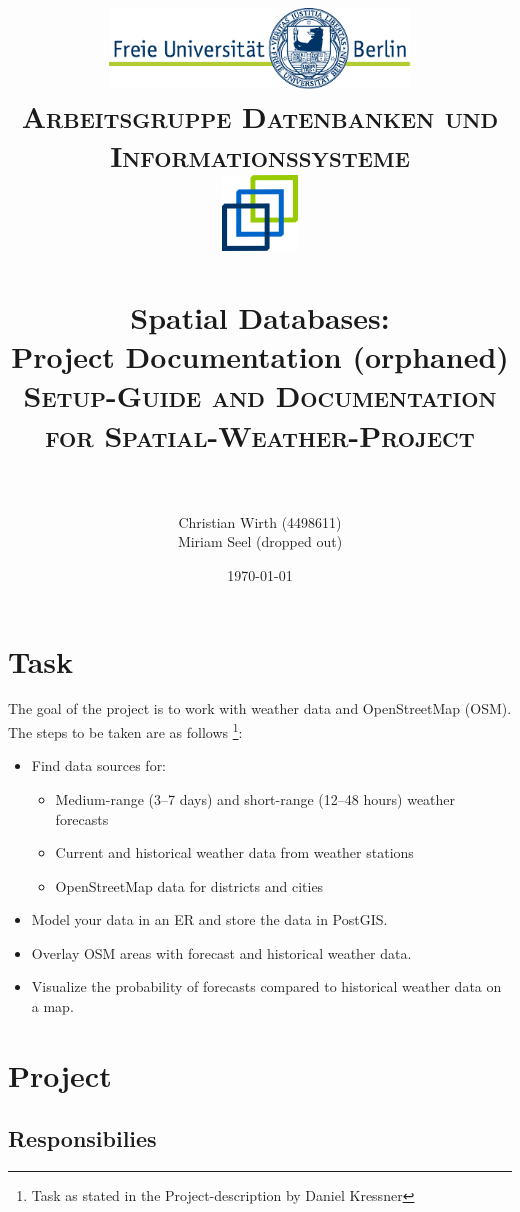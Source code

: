 \documentclass[paper=a4, fontsize=11pt]{article} %
\title{	
\normalfont \normalsize 
\textsc{\includegraphics[width=0.6\textwidth]{pictures/logo} \\ [5pt] Arbeitsgruppe Datenbanken und Informationssysteme \\ [20pt] \includegraphics[width=0.15\textwidth]{pictures/DBIS_Logo_rgb_web.png}} \\ [10pt] %
\horrule{0.5pt} \\[0.4cm] %
\huge Spatial Databases:\\ Project Documentation (orphaned) \\ [0.15cm] %
\normalsize \textsc{Setup-Guide and Documentation for Spatial-Weather-Project} \\ [0.4cm]
\horrule{2pt} \\[0.5cm] %
}
\author{Christian Wirth (4498611) \\ Miriam Seel (dropped out)}
\date{\today}
\numberwithin{equation}{section} %
\numberwithin{figure}{section} %
\numberwithin{table}{section} %
\begin{document}
\begin{titlepage}
\maketitle
\thispagestyle{empty}
\end{titlepage}

\setcounter{page}{1}
\tableofcontents

\newpage
{}
\pagestyle{fancy}
\setcounter{page}{1}
\section{Task}

The goal of the project is to work with weather data and OpenStreetMap (OSM). 
The steps to be taken are as follows \footnote{Task as stated in the Project-description by Daniel Kressner}: 

\begin{itemize}
      \item Find data sources for: 
      \begin{itemize}
         \item Medium-range (3–7 days) and short-range (12–48 hours) weather forecasts
         \item Current and historical weather data from weather stations
         \item OpenStreetMap data for districts and cities
         
      \end{itemize}
      \item Model your data in an ER and store the data in PostGIS.
      \item Overlay OSM areas with forecast and historical weather data.
      \item Visualize the probability of forecasts compared to historical weather data on a map.
   \end{itemize}


\section{Project}
\label{sec:Umsetzung}

\subsection{Responsibilies}
\end{document}
